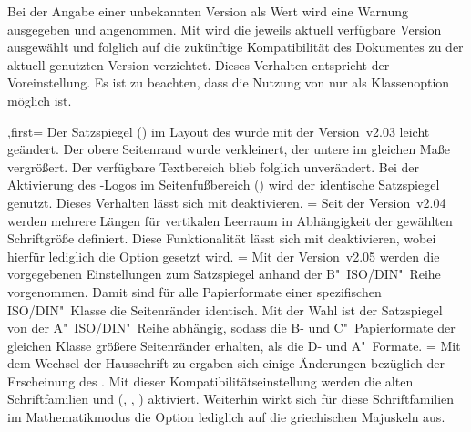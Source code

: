 \begin{Entity}{}
\begin{Declaration}
Bei der Angabe einer unbekannten Version als Wert wird eine Warnung ausgegeben 
und  angenommen. Mit  wird die 
jeweils aktuell verfügbare Version ausgewählt und folglich auf die zukünftige 
Kompatibilität des Dokumentes zu der aktuell genutzten Version verzichtet. 
Dieses Verhalten entspricht der Voreinstellung. Es ist zu beachten, dass die 
Nutzung von  nur als Klassenoption möglich ist.
\begin{DeclareValues}
,first=
  Der Satzspiegel () im Layout des 
  \CDs wurde mit der Version~v2.03 leicht geändert. Der obere Seitenrand wurde 
  verkleinert, der untere im gleichen Maße vergrößert. Der verfügbare 
  Textbereich blieb folglich unverändert. Bei der Aktivierung des \DDC-Logos im 
  Seitenfußbereich () wird der 
  identische Satzspiegel genutzt. Dieses Verhalten lässt sich mit 
   deaktivieren.
=
  Seit der Version~v2.04 werden mehrere Längen für vertikalen Leerraum in 
  Abhängigkeit der gewählten Schriftgröße definiert. Diese Funktionalität lässt 
  sich mit  deaktivieren, wobei hierfür lediglich die 
  Option  gesetzt wird. 
=
  Mit der Version~v2.05 werden die vorgegebenen Einstellungen zum Satzspiegel 
  anhand der B"~ISO/DIN"~Reihe vorgenommen. Damit sind für alle Papierformate 
  einer spezifischen ISO/DIN"~Klasse die Seitenränder identisch. Mit der Wahl 
   ist der Satzspiegel von der A"~ISO/DIN"~Reihe 
  abhängig, sodass die B- und C"~Papierformate der gleichen Klasse größere 
  Seitenränder erhalten, als die D- und A"~Formate.
=
  Mit dem Wechsel der Hausschrift zu \OpenSans ergaben sich einige Änderungen 
  bezüglich der Erscheinung des \CDs. Mit dieser Kompatibilitätseinstellung 
  werden die alten Schriftfamilien \Univers und \DIN 
  (, , )
  aktiviert. Weiterhin wirkt sich für diese Schriftfamilien im Mathematikmodus 
  die Option  lediglich auf die griechischen 
  Majuskeln aus.
  

\end{DeclareValues}
\end{Declaration}
\end{Entity}
